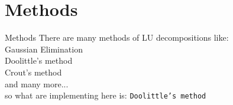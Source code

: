 \documentclass{beamer}
\begin{document}
\section{Methods}
\begin{frame}{Methods}
There are many methods of LU decompositions like:\\
\hspace*{2cm} Gaussian Elimination\\
\hspace*{2cm} Doolittle's method\\
\hspace*{2cm} Crout's method\\
\hspace*{2cm} and many more...\\
so what are implementing here is: \texttt{Doolittle's method}
\end{frame}
\end{document}
